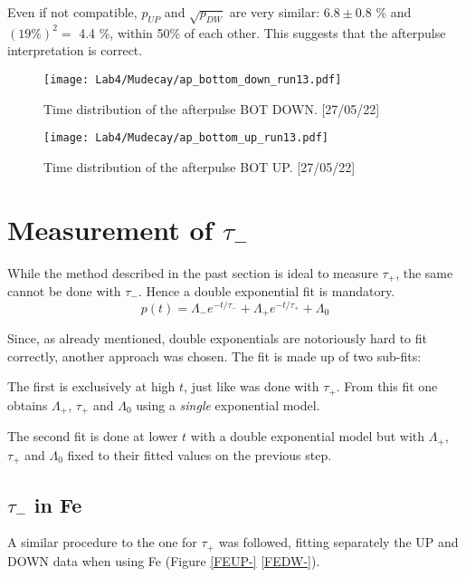 \documentclass[10pt,a4paper,twocolumn]{article}
\begin{document}
Even if not compatible, $p_{UP}$ and $\sqrt{p_{DW}}$ are very similar: $6.8\pm 0.8$ \% and $(19\%)^2 =$ 4.4 \%, within 50\% of each other. This suggests that the afterpulse interpretation is correct.
\\


\begin{figure}[h!]
\centering
\caption{Time distribution of the afterpulse BOT DOWN. [27/05/22]}
\texttt{[image: Lab4/Mudecay/ap\_bottom\_down\_run13.pdf]} 
\label{apbotdw}
\end{figure}

\begin{figure}[h!]
\centering
\caption{Time distribution of the afterpulse BOT UP. [27/05/22]}
\texttt{[image: Lab4/Mudecay/ap\_bottom\_up\_run13.pdf]} 
\label{apbotup}
\end{figure}

\section{Measurement of $\tau_-$}

While the method described in the past section is ideal to measure $\tau_+$, the same cannot be done with $\tau_-$. Hence a double exponential fit is mandatory.
\begin{equation}
    \label{expo_tot}
    p(t)=\Lambda_- e^{-t/\tau_-}+ \Lambda_+e^{-t/\tau_+}+\Lambda_0
\end{equation}





Since, as already mentioned, double exponentials are notoriously hard to fit correctly, another approach was chosen. The fit is made up of two sub-fits:


The first is exclusively at high $t$, just like was done with $\tau_+$. From this fit one obtains $\Lambda_+$, $\tau_+$ and $\Lambda_0$ using a \textit{single} exponential model.

The second fit is done at lower $t$ with a double exponential model but with $\Lambda_+$, $\tau_+$ and $\Lambda_0$ fixed to their fitted values on the previous step.


\subsection{$\tau_-$ in Fe}
A similar procedure to the one for $\tau_+$ was followed, fitting separately the UP and DOWN data when using Fe (Figure \ref{FEUP-} \ref{FEDW-}).
\end{document}
